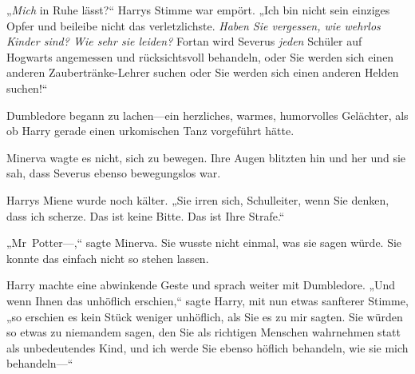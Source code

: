 „\emph{Mich} in Ruhe lässt?“ Harrys Stimme war empört. „Ich bin nicht sein einziges Opfer und beileibe nicht das verletzlichste. \emph{Haben Sie vergessen, wie wehrlos Kinder sind? Wie sehr sie leiden?} Fortan wird Severus \emph{jeden} Schüler auf Hogwarts angemessen und rücksichtsvoll behandeln, oder Sie werden sich einen anderen Zaubertränke-Lehrer suchen oder Sie werden sich einen anderen Helden suchen!“

Dumbledore begann zu lachen—ein herzliches, warmes, humorvolles Gelächter, als ob Harry gerade einen urkomischen Tanz vorgeführt hätte.

Minerva wagte es nicht, sich zu bewegen. Ihre Augen blitzten hin und her und sie sah, dass Severus ebenso bewegungslos war.

Harrys Miene wurde noch kälter. „Sie irren sich, Schulleiter, wenn Sie denken, dass ich scherze. Das ist keine Bitte. Das ist Ihre Strafe.“

„Mr~Potter—,“ sagte Minerva. Sie wusste nicht einmal, was sie sagen würde. Sie konnte das einfach nicht so stehen lassen.

Harry machte eine abwinkende Geste und sprach weiter mit Dumbledore. „Und wenn Ihnen das unhöflich erschien,“ sagte Harry, mit nun etwas sanfterer Stimme, „so erschien es kein Stück weniger unhöflich, als Sie es zu mir sagten. Sie würden so etwas zu niemandem sagen, den Sie als richtigen Menschen wahrnehmen statt als unbedeutendes Kind, und ich werde Sie ebenso höflich behandeln, wie sie mich behandeln—“

